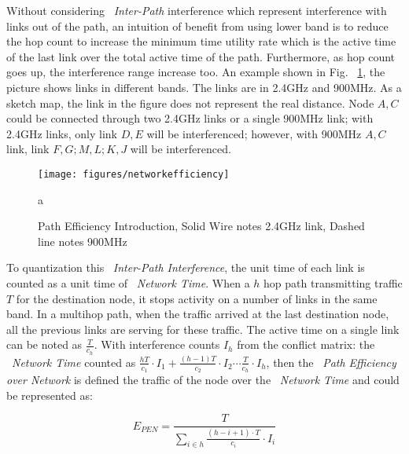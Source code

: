 Without considering ~\emph{Inter-Path} interference which represent interference with links out of the path, 
an intuition of benefit from using lower band is to reduce the hop count
 to increase the minimum time utility rate which is the active time of the last link over the total active time of the path. 
Furthermore, as hop count goes up, the interference range increase too. An example shown in Fig. ~\ref{fig:networkefficiency}, 
the picture shows links in different bands. The links are in 2.4GHz and 900MHz. As a sketch map, the link in the figure does not represent the real distance.
Node $A,C$ could be connected through two 2.4GHz links or a single 900MHz link; with 2.4GHz links, only link $D,E$ will be interferenced; however, with 900MHz $A,C$ link, link $F,G;M,L;K,J$ will be interferenced. 

\begin{figure}
\centering
\texttt{[image: figures/networkefficiency]}
\vspace{-0.1in}
\caption{Path Efficiency Introduction, Solid Wire notes 2.4GHz link, Dashed line notes 900MHz}
\label{fig:networkefficiency}
a\end{figure}

To quantization this ~\emph{Inter-Path Interference}, 
the unit time of each link is counted as a unit time of ~\emph{Network Time}. 
When a $h$ hop path transmitting traffic $T$ for the destination node, it stops activity on a number of links in the same band. 
In a multihop path, when the traffic arrived at the last destination node, all the previous links are serving for these traffic.
The active time on a single link can be noted as 
$\frac{T}{c_h}$. 
With interference counts $I_h$ from the conflict matrix:
the ~\emph{Network Time} counted as 
$\frac{hT}{c_1}\cdot I_1 + \frac{(h-1)T}{c_2}\cdot I_2 \cdots \frac{T}{c_h}\cdot I_h$, 
then the ~\emph{Path Efficiency over Network} is defined the traffic of the node over the ~\emph{Network Time} and could be represented as:



\begin{equation}
\label{eq:originpen}
E_{PEN}=\frac{T}{\sum_{i \in h}\frac{(h-i+1)\cdot T}{c_i}\cdot I_i }
\end{equation}

